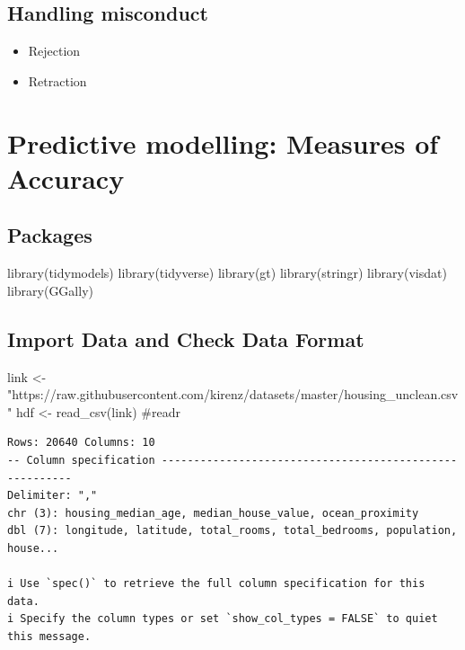 \documentclass[
  letterpaper,
  DIV=11,
  numbers=noendperiod]{scrreprt}
\newenvironment{Shaded}{\begin{snugshade}}{\end{snugshade}}
\newcommand{\CommentTok}[1]{\textcolor[rgb]{0.37,0.37,0.37}{#1}}
\newcommand{\FunctionTok}[1]{\textcolor[rgb]{0.28,0.35,0.67}{#1}}
\newcommand{\NormalTok}[1]{\textcolor[rgb]{0.00,0.23,0.31}{#1}}
\newcommand{\OtherTok}[1]{\textcolor[rgb]{0.00,0.23,0.31}{#1}}
\newcommand{\StringTok}[1]{\textcolor[rgb]{0.13,0.47,0.30}{#1}}
\begin{document}
\section{Handling misconduct}\label{handling-misconduct}

\begin{itemize}
\item
  Rejection
\item
  Retraction
\end{itemize}


\chapter{Predictive modelling: Measures of
Accuracy}\label{predictive-modelling-measures-of-accuracy}

\section{Packages}\label{packages}

\begin{Shaded}
\begin{Highlighting}[]
\FunctionTok{library}\NormalTok{(tidymodels)}
\FunctionTok{library}\NormalTok{(tidyverse)}
\FunctionTok{library}\NormalTok{(gt)}
\FunctionTok{library}\NormalTok{(stringr)}
\FunctionTok{library}\NormalTok{(visdat)}
\FunctionTok{library}\NormalTok{(GGally)}
\end{Highlighting}
\end{Shaded}

\section{Import Data and Check Data
Format}\label{import-data-and-check-data-format}

\begin{Shaded}
\begin{Highlighting}[]
\NormalTok{link }\OtherTok{\textless{}{-}} \StringTok{"https://raw.githubusercontent.com/kirenz/datasets/master/housing\_unclean.csv"}
\NormalTok{hdf }\OtherTok{\textless{}{-}} \FunctionTok{read\_csv}\NormalTok{(link) }\CommentTok{\#readr}
\end{Highlighting}
\end{Shaded}

\begin{verbatim}
Rows: 20640 Columns: 10
-- Column specification --------------------------------------------------------
Delimiter: ","
chr (3): housing_median_age, median_house_value, ocean_proximity
dbl (7): longitude, latitude, total_rooms, total_bedrooms, population, house...

i Use `spec()` to retrieve the full column specification for this data.
i Specify the column types or set `show_col_types = FALSE` to quiet this message.
\end{verbatim}
\end{document}

